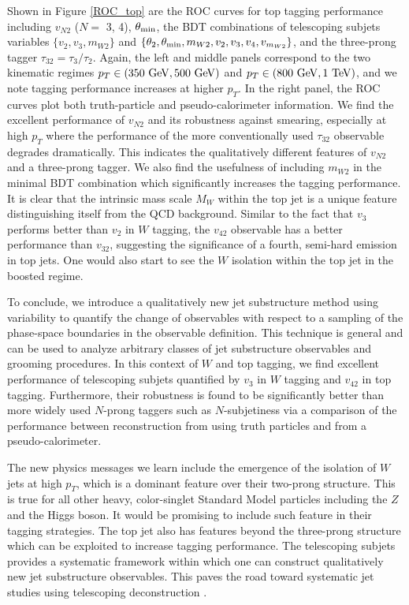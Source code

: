 \documentclass[aps,prl,floatfix,preprintnumbers,twocolumn,groupedaddress,nofootinbib]{revtex4-1}
\begin{document}
Shown in Figure \ref{ROC_top} are the ROC curves for top tagging performance including $v_{N2}$ ($N = $ 3, 4), $\theta_{\rm min}$, the BDT combinations of telescoping subjets variables $\{v_2, v_3, m_{W2}\}$ and $\{\theta_2,\theta_{\rm min},m_{W2},v_2,v_3,v_4,v_{m_{W2}}\}$, and the three-prong tagger $\tau_{32}=\tau_{3}/\tau_{2}$. Again, the left and middle panels correspond to the two kinematic regimes $p_T \in (350~{\rm GeV}, 500~{\rm GeV})$ and $p_T \in (800~{\rm GeV}, 1~{\rm TeV})$, and we note tagging performance increases at higher $p_T$. In the right panel, the ROC curves plot both truth-particle and pseudo-calorimeter information. We find the excellent performance of $v_{N2}$ and its robustness against smearing, especially at high $p_T$ where the performance of the more conventionally used $\tau_{32}$ observable degrades dramatically. This indicates the qualitatively different features of $v_{N2}$ and a three-prong tagger. We also find the usefulness of including $m_{W2}$ in the minimal BDT combination which significantly increases the tagging performance. It is clear that the intrinsic mass scale $M_W$ within the top jet is a unique feature distinguishing itself from the QCD background. Similar to the fact that $v_3$ performs better than $v_2$ in $W$ tagging, the $v_{42}$ observable has a better performance than $v_{32}$, suggesting the significance of a fourth, semi-hard emission in top jets. One would also start to see the $W$ isolation within the top jet in the boosted regime.

To conclude, we introduce a qualitatively new jet substructure method using variability to quantify the change of observables with respect to a sampling of the phase-space boundaries in the observable definition. This technique is general and can be used to analyze arbitrary classes of jet substructure observables and grooming procedures. In this context of $W$ and top tagging, we find excellent performance of telescoping subjets quantified by $v_3$ in $W$ tagging and $v_{42}$ in top tagging. Furthermore, their robustness is found to be significantly better than more widely used $N$-prong taggers such as $N$-subjetiness via a comparison of the performance between reconstruction from using truth particles and from a pseudo-calorimeter.

The new physics messages we learn include the emergence of the isolation of $W$ jets at high $p_T$, which is a dominant feature over their two-prong structure. This is true for all other heavy, color-singlet Standard Model particles including the $Z$ and the Higgs boson. It would be promising to include such feature in their tagging strategies. The top jet also has features beyond the three-prong structure which can be exploited to increase tagging performance. The telescoping subjets provides a systematic framework within which one can construct qualitatively new jet substructure observables. This paves the road toward systematic jet studies using telescoping deconstruction \cite{Chien:2017decon}.
\end{document}
